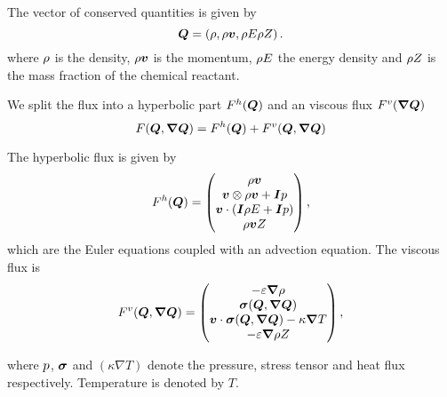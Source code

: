 The vector of conserved quantities is given by
\begin{equation}
  \label{eq:conserved-variables}
 \bm{Q} = \left( \rho, \rho \bm{v}, \rho E \rho Z \right).
\end{equation}
where $\rho$ is the density, $\rho \bm{v}$ is the momentum, $\rho E$ the energy density and $\rho Z$ is the mass fraction of the chemical reactant.

We split the flux into a hyperbolic part $F^{h}(\bm{Q})$ and an viscous flux $\viscFlux(\gradQ)$
\begin{equation}
  \label{eq:flux}
  \flux(\Q, \gradQ) = \hyperFlux(\Q) + \viscFlux(\Q, \gradQ)
\end{equation}

The hyperbolic flux is given by
\begin{equation}
  \label{eq:hyper-flux}
  F^{h}(\bm{Q}) = 
  \begin{pmatrix}
    \rho \bm{v} \\
    \bm{v}  \otimes \rho \bm{v} + \bm{I} p  \\
    \bm{v} \cdot (\bm{I} \rho E + \bm{I} p) \\
    \rho \bm{v} Z
  \end{pmatrix},
\end{equation}
which are the Euler equations coupled with an advection equation.
\newcommand{\diffCoeff}{\varepsilon}
The viscous flux is
\begin{equation}
  \label{eq:visc-flux}
  \viscFlux(\Q, \gradQ) = 
  \begin{pmatrix}
    -\diffCoeff \gradient{\Qrho}\\
    \stressT (\Q, \gradQ)  \\
    \Qv \cdot \stressT (\Q, \gradQ) - \kappa \gradient{T}\\
    -\diffCoeff \gradient{\QZ}
  \end{pmatrix},
\end{equation}

where $p$, $\bm{\sigma}$ and $(\kappa \nabla T)$ denote the pressure, stress tensor and heat flux respectively.
Temperature is denoted by $T$.

